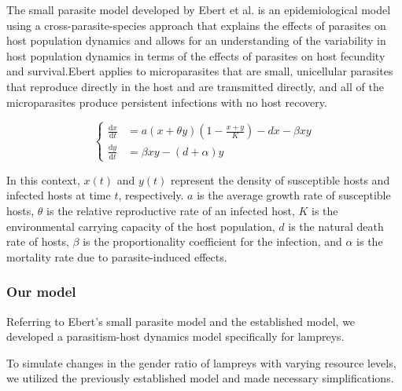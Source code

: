 \documentclass[CTeX = true]{mcmthesis}  %
\begin{document}
The small parasite model developed by Ebert et al. is an epidemiological model using a cross-parasite-species approach that explains the effects of parasites on host population dynamics and allows for an understanding of the variability in host population dynamics in terms of the effects of parasites on host fecundity and survival.Ebert applies to microparasites that are small, unicellular parasites that reproduce directly in the host and are transmitted directly, and all of the microparasites produce persistent infections with no host recovery.

\begin{equation}
\left\{\begin{aligned} 
  \frac{\mathrm{d} x}{\mathrm{d} t} &=a(x+\theta y)(1-\frac{x+y}{K})-dx-\beta xy   \\  
\frac{\mathrm{d} y}{\mathrm{d} t} &= \beta xy-(d+\alpha ) y
\end{aligned}\right. 
\end{equation}

In this context, \(x(t)\) and \(y(t)\) represent the density of susceptible hosts and infected hosts at time \(t\), respectively. \(a\) is the average growth rate of susceptible hosts, \(\theta\) is the relative reproductive rate of an infected host, \(K\) is the environmental carrying capacity of the host population, \(d\) is the natural death rate of hosts, \(\beta\) is the proportionality coefficient for the infection, and \(\alpha\) is the mortality rate due to parasite-induced effects.

\subsubsection{Our model}
Referring to Ebert's small parasite model and the established model, we developed a parasitism-host dynamics model specifically for lampreys.

To simulate changes in the gender ratio of lampreys with varying resource levels, we utilized the previously established model and made necessary simplifications.
\end{document}

